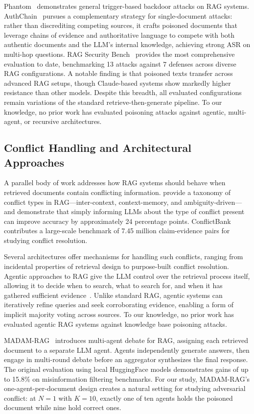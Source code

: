 \documentclass[11pt]{article}
\begin{document}
Phantom~\citep{chaudhari2024phantom} demonstrates general trigger-based backdoor attacks on RAG systems. AuthChain~\citep{authchain2025} pursues a complementary strategy for single-document attacks: rather than discrediting competing sources, it crafts poisoned documents that leverage chains of evidence and authoritative language to compete with both authentic documents and the LLM's internal knowledge, achieving strong ASR on multi-hop questions. RAG Security Bench~\citep{ragsecbench2025} provides the most comprehensive evaluation to date, benchmarking 13 attacks against 7 defenses across diverse RAG configurations. A notable finding is that poisoned texts transfer across advanced RAG setups, though Claude-based systems show markedly higher resistance than other models. Despite this breadth, all evaluated configurations remain variations of the standard retrieve-then-generate pipeline. To our knowledge, no prior work has evaluated poisoning attacks against agentic, multi-agent, or recursive architectures.

\subsection{Conflict Handling and Architectural Approaches}

A parallel body of work addresses how RAG systems should behave when retrieved documents contain conflicting information. \citet{xie2024dragged} provide a taxonomy of conflict types in RAG---inter-context, context-memory, and ambiguity-driven---and demonstrate that simply informing LLMs about the type of conflict present can improve accuracy by approximately 24 percentage points. ConflictBank~\citep{conflictbank2024} contributes a large-scale benchmark of 7.45 million claim-evidence pairs for studying conflict resolution.

Several architectures offer mechanisms for handling such conflicts, ranging from incidental properties of retrieval design to purpose-built conflict resolution. Agentic approaches to RAG give the LLM control over the retrieval process itself, allowing it to decide when to search, what to search for, and when it has gathered sufficient evidence~\citep{yao2023react,schick2023toolformer}. Unlike standard RAG, agentic systems can iteratively refine queries and seek corroborating evidence, enabling a form of implicit majority voting across sources. To our knowledge, no prior work has evaluated agentic RAG systems against knowledge base poisoning attacks.

MADAM-RAG~\citep{wang2025madamrag} introduces multi-agent debate for RAG, assigning each retrieved document to a separate LLM agent. Agents independently generate answers, then engage in multi-round debate before an aggregator synthesizes the final response. The original evaluation using local HuggingFace models demonstrates gains of up to 15.8\% on misinformation filtering benchmarks. For our study, MADAM-RAG's one-agent-per-document design creates a natural setting for studying adversarial conflict: at $N{=}1$ with $K{=}10$, exactly one of ten agents holds the poisoned document while nine hold correct ones.
\end{document}
